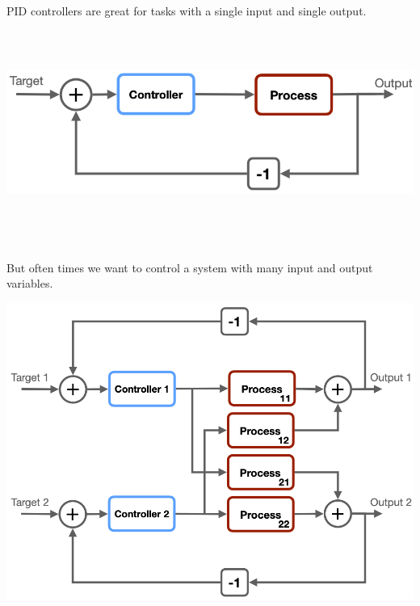 \documentclass[
  letterpaper,
  DIV=11,
  numbers=noendperiod,
  oneside]{scrartcl}
\begin{document}
PID controllers are great for tasks with a single input and single
output.

\begin{center}
\includegraphics[width=\textwidth,height=2.60417in]{figs/feedback_SISO.png}
\end{center}

\subsection{}\label{section-56}

But often times we want to control a system with many input and output
variables.

\begin{center}
\includegraphics{figs/feedback_MIMO.png}
\end{center}

\subsection{}\label{section-57}
\end{document}
